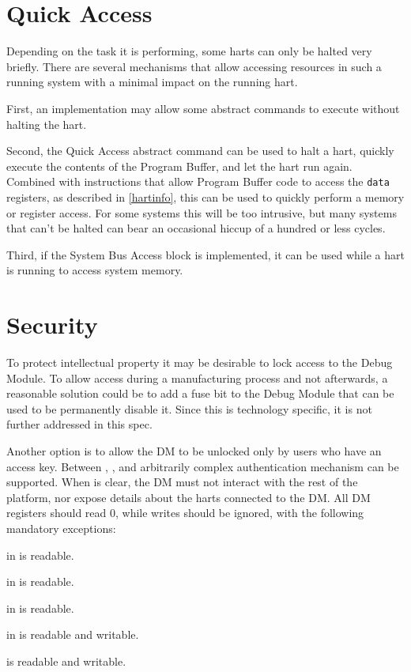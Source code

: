 \section{Quick Access}

Depending on the task it is performing, some harts can only be halted very briefly.
There are several mechanisms that allow accessing resources in such a running system
with a minimal impact on the running hart.

First, an implementation may allow some abstract commands to execute without halting the hart.

Second, the Quick Access abstract command can be used to halt a hart, quickly
execute the contents of the Program Buffer, and let the hart run again.
Combined with instructions that allow Program Buffer code to access the
{\tt data} registers, as described in \ref{hartinfo}, this can be used to quickly
perform a memory or register access. For some systems this will be too
intrusive, but many systems that can't be halted can bear an occasional hiccup
of a hundred or less cycles.

Third, if the System Bus Access block is implemented, it can be used while a
hart is running to access system memory.

\section{Security}

To protect intellectual property it may be desirable to lock access to the
Debug Module.  To allow access during a manufacturing process and not
afterwards, a reasonable solution could be to add a fuse bit to the Debug
Module that can be used to be permanently disable it. Since this is technology
specific, it is not further addressed in this spec.

Another option is to allow the DM to be unlocked only by users who have an
access key. Between \Fauthenticated, \Fauthbusy, and \Rauthdata arbitrarily
complex authentication mechanism can be supported.  When \Fauthenticated is
clear, the DM must not interact with the rest of the platform, nor expose
details about the harts connected to the DM. All DM registers should read 0,
while writes should be ignored, with the following mandatory exceptions:
\begin{steps}{}
    \item \Fauthenticated in \Rdmstatus is readable.
    \item \Fauthbusy in \Rdmstatus is readable.
    \item \Fversion in \Rdmstatus is readable.
    \item \Fdmactive in \Rdmcontrol is readable and writable.
    \item \Rauthdata is readable and writable.
\end{steps}

